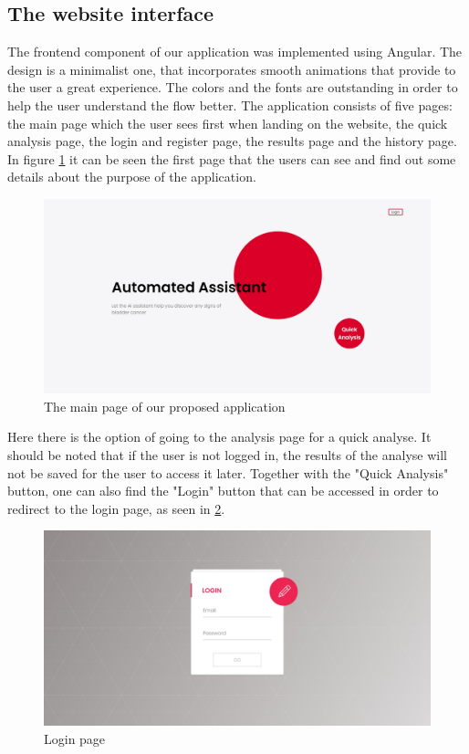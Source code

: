 \documentclass[runningheads,a4paper,11pt]{report}
\begin{document}
\subsection{The website interface}

The frontend component of our application was implemented using Angular. The design is a minimalist one, that incorporates smooth animations that provide to the user a great experience. The colors and the fonts are outstanding in order to help the user understand the flow better. The application consists of five pages: the main page which the user sees first when landing on the website, the quick analysis page, the login and register page, the results page and the history page. In figure \ref{frontend_dashboard} it can be seen the first page that the users can see and find out some details about the purpose of the application. 

\begin{figure}[h!]
	\centerline{\includegraphics[width=17cm]{images/frontend_dashboard.jpeg}} 
	\caption{The main page of our proposed application}
	\label{frontend_dashboard}
\end{figure}

Here there is the option of going to the analysis page for a quick analyse. It should be noted that if the user is not logged in, the results of the analyse will not be saved for the user to access it later. Together with the "Quick Analysis" button, one can also find the "Login" button that can be accessed in order to redirect to the login page, as seen in \ref{frontend_login}.

\begin{figure}[h!]
	\centerline{\includegraphics[width=17cm]{images/frontend_login.jpeg}} 
	\caption{Login page}
	\label{frontend_login}
\end{figure}
\end{document}
